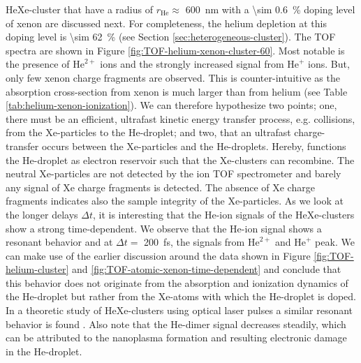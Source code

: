 HeXe-cluster that have a radius of $r_{\text{He}}\approx$ \SI{600}{\nano\meter} with a \SI{\sim 0.6}{\percent} doping level of xenon are discussed next. For completeness, the helium depletion at this doping level is \SI{\sim 62}{\percent} (see Section \ref{sec:heterogeneous-cluster}). The TOF spectra are shown in Figure \ref{fig:TOF-helium-xenon-cluster-60}. Most notable is the presence of $\text{He}^{2+}$ ions and the strongly increased signal from $\text{He}^{+}$ ions. But, only few xenon charge fragments are observed. This is counter-intuitive as the absorption cross-section from xenon is much larger than from helium (see Table \ref{tab:helium-xenon-ionization}). We can therefore hypothesize two points; one, there must be an efficient, ultrafast kinetic energy transfer process, e.g. collisions, from the Xe-particles to the He-droplet; and two, that an ultrafast charge-transfer occurs between the Xe-particles and the He-droplets. Hereby, functions the He-droplet as electron reservoir such that the Xe-clusters can recombine. The neutral Xe-particles are not detected by the ion TOF spectrometer and barely any signal of Xe charge fragments is detected. The absence of Xe charge fragments indicates also the sample integrity of the Xe-particles. As we look at the longer delays $\Delta t$, it is interesting that the He-ion signals of the HeXe-clusters show a strong time-dependent. We observe that the He-ion signal shows a resonant behavior and at $\Delta t =$ \SI{200}{\femto\second}, the signals from $\text{He}^{2+}$ and $\text{He}^{+}$ peak. We can make use of the earlier discussion around the data shown in Figure \ref{fig:TOF-helium-cluster} and \ref{fig:TOF-atomic-xenon-time-dependent} and conclude that this behavior does not originate from the absorption and ionization dynamics of the He-droplet but rather from the Xe-atoms with which the He-droplet is doped. In a theoretic study of HeXe-clusters using optical laser pulses a similar resonant behavior is found \citep{Mikaberidze-2008-PRA}. Also note that the He-dimer signal decreases steadily, which can be attributed to the nanoplasma formation and resulting electronic damage in the He-droplet.\\[1\baselineskip]
